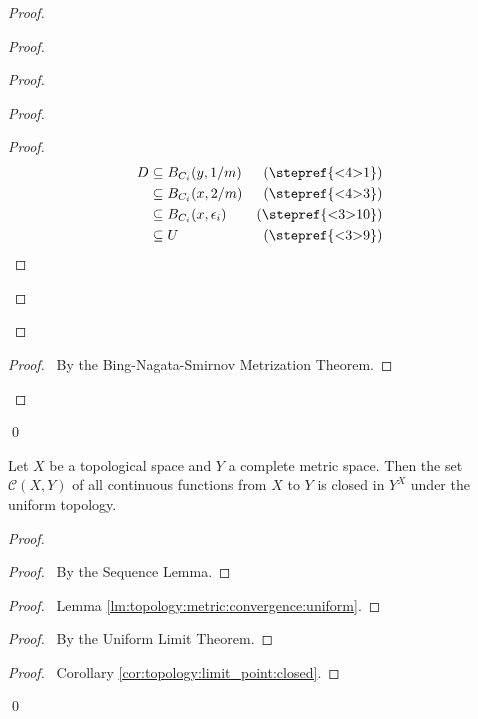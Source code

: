 \begin{proof}
\begin{proof}
\begin{proof}
\begin{proof}
        \begin{proof}
          \pf
          \begin{align*}
            D & \subseteq B_{C_i}(y, 1/m) & (\text{\stepref{<4>1}})\\
            & \subseteq B_{C_i}(x, 2/m) & (\text{\stepref{<4>3}})\\
            & \subseteq B_{C_i}(x, \epsilon_i) & (\text{\stepref{<3>10}})\\
            & \subseteq U & (\text{\stepref{<3>9}})
          \end{align*}
        \end{proof}
      \end{proof}
    \end{proof}
    \qedstep
    \begin{proof}
      \pf\ By the Bing-Nagata-Smirnov Metrization Theorem.
    \end{proof}
  \end{proof}
  \qed
\end{proof}

\begin{thm}
  \label{thm:topology:metric:continuous_closed}
  Let $X$ be a topological space and $Y$ a complete metric space. Then the set $\mathcal{C}(X, Y)$ of all continuous functions from $X$ to $Y$ is closed in $Y^X$ under the uniform topology.
\end{thm}

\begin{proof}
  \pf
  \begin{proof}
    \pf\ By the Sequence Lemma.
  \end{proof}
  \begin{proof}
    \pf\ Lemma \ref{lm:topology:metric:convergence:uniform}.
  \end{proof}
  \begin{proof}
    \pf\ By the Uniform Limit Theorem.
  \end{proof}
  \qedstep
  \begin{proof}
    \pf\ Corollary \ref{cor:topology:limit_point:closed}.
  \end{proof}
  \qed
\end{proof}

